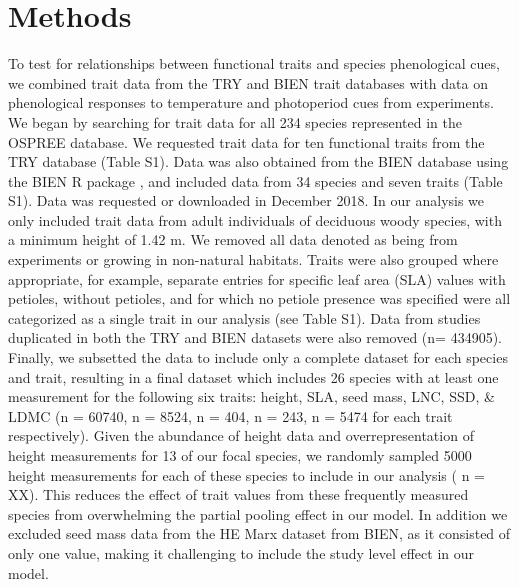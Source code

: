 \documentclass{article}\usepackage[]{graphicx}\usepackage[]{color}
\begin{document}
\section{Methods}
To test for relationships between functional traits and species phenological cues, we combined trait data from the TRY and BIEN trait databases with data on phenological responses to temperature and photoperiod cues from experiments. We began by searching for trait data for all 234 species represented in the OSPREE database. We requested trait data for ten functional traits from the TRY database (Table S1). Data was also obtained from the BIEN database using the BIEN R package \citep{Maitner2017}, and included data from 34 species and seven traits (Table S1). Data was requested or downloaded in December 2018. In our analysis we only included trait data from adult individuals of deciduous woody species, with a minimum height of 1.42 m. We removed all data denoted as being from experiments or growing in non-natural habitats. Traits were also grouped where appropriate, for example, separate entries for specific leaf area (SLA) values with petioles, without petioles, and for which no petiole presence was specified were all categorized as a single trait in our analysis (see Table S1). Data from studies duplicated in both the TRY and BIEN datasets were also removed (n= 434905).  Finally, we subsetted the data to include only a complete dataset for each species and trait, resulting in a final dataset which includes 26 species with at least one measurement for the following six traits: height, SLA, seed mass, LNC, SSD, \& LDMC (n = 60740, n = 8524, n = 404, n = 243, n = 5474 for each trait respectively). Given the abundance of height data and overrepresentation of height measurements for 13 of our focal species, we randomly sampled 5000 height measurements for each of these species to include in our analysis ( n = XX). This reduces the effect of trait values from these frequently measured species from overwhelming the partial pooling effect in our model. In addition we excluded seed mass data from the HE Marx dataset from BIEN, as it consisted of only one value, making it challenging to include the study level effect in our model.%
\end{document}
